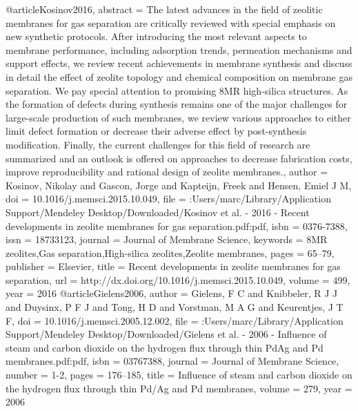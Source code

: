 @article{Kosinov2016,
abstract = {The latest advances in the field of zeolitic membranes for gas separation are critically reviewed with special emphasis on new synthetic protocols. After introducing the most relevant aspects to membrane performance, including adsorption trends, permeation mechanisms and support effects, we review recent achievements in membrane synthesis and discuss in detail the effect of zeolite topology and chemical composition on membrane gas separation. We pay special attention to promising 8MR high-silica structures. As the formation of defects during synthesis remains one of the major challenges for large-scale production of such membranes, we review various approaches to either limit defect formation or decrease their adverse effect by post-synthesis modification. Finally, the current challenges for this field of research are summarized and an outlook is offered on approaches to decrease fabrication costs, improve reproducibility and rational design of zeolite membranes.},
author = {Kosinov, Nikolay and Gascon, Jorge and Kapteijn, Freek and Hensen, Emiel J M},
doi = {10.1016/j.memsci.2015.10.049},
file = {:Users/marc/Library/Application Support/Mendeley Desktop/Downloaded/Kosinov et al. - 2016 - Recent developments in zeolite membranes for gas separation.pdf:pdf},
isbn = {0376-7388},
issn = {18733123},
journal = {Journal of Membrane Science},
keywords = {8MR zeolites,Gas separation,High-silica zeolites,Zeolite membranes},
pages = {65--79},
publisher = {Elsevier},
title = {{Recent developments in zeolite membranes for gas separation}},
url = {http://dx.doi.org/10.1016/j.memsci.2015.10.049},
volume = {499},
year = {2016}
}
@article{Gielens2006,
author = {Gielens, F C and Knibbeler, R J J and Duysinx, P F J and Tong, H D and Vorstman, M A G and Keurentjes, J T F},
doi = {10.1016/j.memsci.2005.12.002},
file = {:Users/marc/Library/Application Support/Mendeley Desktop/Downloaded/Gielens et al. - 2006 - Influence of steam and carbon dioxide on the hydrogen flux through thin PdAg and Pd membranes.pdf:pdf},
isbn = {03767388},
journal = {Journal of Membrane Science},
number = {1-2},
pages = {176--185},
title = {{Influence of steam and carbon dioxide on the hydrogen flux through thin Pd/Ag and Pd membranes}},
volume = {279},
year = {2006}
}
